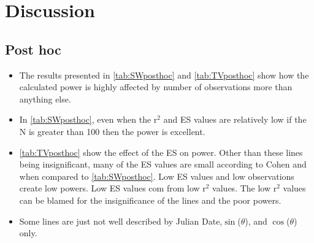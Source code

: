 \section{Discussion}
\subsection{Post hoc}
\begin{itemize}
	\item The results presented in \autoref{tab:SWposthoc} and \autoref{tab:TVposthoc} show how the calculated power is highly affected by number of observations more than anything else.
	\item In \autoref{tab:SWposthoc}, even when the r$^2$ and ES values are relatively low if the N is greater than 100 then the power is excellent.
	\item \autoref{tab:TVposthoc} show the effect of the ES on power.  Other than these lines being insignificant, many of the ES values are small according to Cohen and when compared to \autoref{tab:SWposthoc}.  Low ES values and low observations create low powers.  Low ES values com from low r$^2$ values.  The low r$^2$ values can be blamed for the insignificance of the lines and the poor powers. 
	\item Some lines are just not well described by Julian Date,$\sin$($\theta$), and $\cos$($\theta$) only.
\end{itemize}
